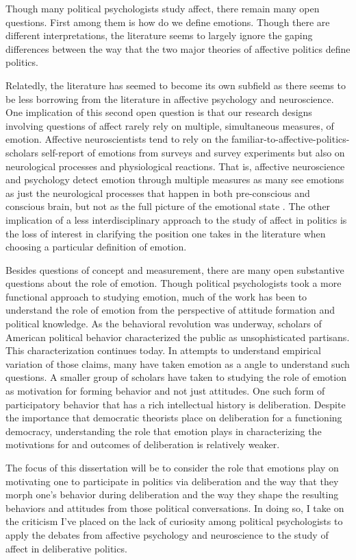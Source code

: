 \documentclass [12pt]{article}
\begin{document}
Though many political psychologists study affect, there remain many open questions. First among them is how do we define emotions. Though there are different interpretations, the literature seems to largely ignore the gaping differences between the way that the two major theories of affective politics define politics. 

Relatedly, the literature has seemed to become its own subfield as there seems to be less borrowing from the literature in affective psychology and neuroscience. One implication of this second open question is that our research designs involving questions of affect rarely rely on multiple, simultaneous measures, of emotion. Affective neuroscientists tend to rely on the familiar-to-affective-politics-scholars self-report of emotions from surveys and survey experiments but also on neurological processes and physiological reactions. That is, affective neuroscience  and psychology detect emotion through multiple measures as many see emotions as just the neurological processes that happen in both pre-conscious and conscious brain, but not as the full picture of the emotional state \citep{ralph_anderson_2019}. The other implication of a less interdisciplinary approach to the study of affect in politics is the loss of interest in clarifying the position one takes in  the literature when choosing a particular definition of emotion. 

Besides questions of concept and measurement, there are many open substantive questions about the role of emotion. Though political psychologists took a more functional approach to studying emotion, much of the work has been to understand the role of emotion from the perspective of attitude formation and political knowledge. As the behavioral revolution was underway, scholars of American political behavior characterized the public as unsophisticated partisans. This characterization continues today. In attempts to understand empirical variation of those claims, many have taken emotion as a angle to understand such questions. A smaller group of scholars have taken to studying the role of emotion as motivation for forming behavior and not just attitudes. One such form of participatory behavior that has a rich intellectual history is deliberation. Despite the importance that democratic theorists place on deliberation for a functioning democracy, understanding the role that emotion plays in characterizing the motivations for and outcomes of deliberation is relatively weaker.

The focus of this dissertation will be to consider the role that emotions play on motivating one to participate in politics via deliberation and the way that they morph one's behavior during deliberation and the way they shape the resulting behaviors and attitudes from those political conversations. In doing so, I take on the criticism I've placed on the lack of curiosity among political psychologists to apply the debates from affective psychology and neuroscience to the study of affect in deliberative politics. 
\end{document}
